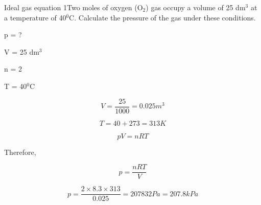 \begin{wex}{Ideal gas equation 1}{Two moles of oxygen (O$_{2}$) gas occupy a volume of 25 dm$^{3}$ at a temperature of 40$^{0}$C. Calculate the pressure of the gas under these conditions.\\}

{

p = ?

V = 25 dm$^{3}$

n = 2

T = 40$^{0}$C
\\
}

{

\begin{equation*}
V = \frac{25}{1000} = 0.025 m^{3}
\end{equation*}

\begin{equation*}
T = 40 + 273 = 313 K
\end{equation*}
}

{

\begin{equation*}
pV = nRT
\end{equation*}

Therefore,

\begin{equation*}
p = \frac{nRT}{V}
\end{equation*}
}

{

\begin{equation*}
p = \frac{2 \times 8.3 \times 313}{0.025} = 207832 Pa = 207.8 kPa
\end{equation*}
}
\end{wex}

